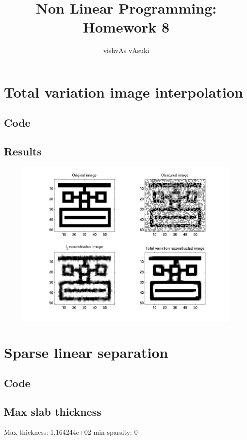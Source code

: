 \documentclass{article}
\title{Non Linear Programming: Homework 8}
\author{vishvAs vAsuki}
\begin{document}
\maketitle
\section{Total variation image interpolation}
\subsection{Code}


\subsection{Results}
\begin{figure}
\includegraphics[scale=0.25]{code/imageInterpolation.jpg}
\end{figure}

\section{Sparse linear separation}
\subsection{Code}


\subsection{Max slab thickness}
Max thickness: 1.164244e+02 min sparsity: 0
\end{document}
